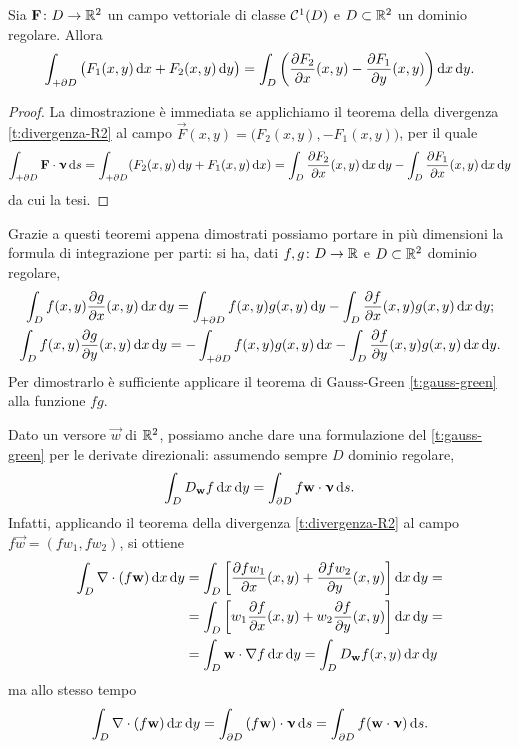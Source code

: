 \begin{teorema} \label{t:rotore-R2}
	Sia $\mathbf{F}\colon D\to\mathbb{R}^2$ un campo vettoriale di classe $\mathcal{C}^{{1}}(D)$ e $D\subset\mathbb{R}^2$ un dominio regolare.
	Allora
	\begin{equation}
		\int_{+\partial D}\big(F_1(x,y)\,\textup{d} x+F_2(x,y)\,\textup{d} y\big)=\int_D\bigg(\frac{\partial {F_2}}{\partial {x}}(x,y)-\frac{\partial {F_1}}{\partial {y}}(x,y)\bigg)\,\textup{d} x\,\textup{d} y.
		\label{eq:rotore-R2}
	\end{equation}
\end{teorema}
\begin{proof}
	La dimostrazione è immediata se applichiamo il teorema della divergenza \ref{t:divergenza-R2} al campo $\vec F(x,y)=\big(F_2(x,y),-F_1(x,y)\big)$, per il quale
	\begin{equation}
		\int_{+\partial D}{\mathbf{F}}\cdot{\bm{\upnu}}\,\textup{d} s=\int_{+\partial D}(F_2(x,y)\,\textup{d} y+F_1(x,y)\,\textup{d} x)=\int_D\frac{\partial {F_2}}{\partial {x}}(x,y)\,\textup{d} x\,\textup{d} y-\int_D\frac{\partial {F_1}}{\partial {x}}(x,y)\,\textup{d} x\,\textup{d} y
	\end{equation}
	da cui la tesi.
\end{proof}
Grazie a questi teoremi appena dimostrati possiamo portare in più dimensioni la formula di integrazione per parti: si ha, dati $f,g\colon D\to\mathbb{R}$ e $D\subset\mathbb{R}^2$ dominio regolare,
\begin{gather}
	\int_D f(x,y)\frac{\partial {g}}{\partial {x}}(x,y)\,\textup{d} x\,\textup{d} y=\int_{+\partial D}f(x,y)g(x,y)\,\textup{d} y-\int_D\frac{\partial {f}}{\partial {x}}(x,y)g(x,y)\,\textup{d} x\,\textup{d} y;\\
	\int_D f(x,y)\frac{\partial {g}}{\partial {y}}(x,y)\,\textup{d} x\,\textup{d} y=-\int_{+\partial D}f(x,y)g(x,y)\,\textup{d} x-\int_D\frac{\partial {f}}{\partial {y}}(x,y)g(x,y)\,\textup{d} x\,\textup{d} y.
\end{gather}
Per dimostrarlo è sufficiente applicare il teorema di Gauss-Green \ref{t:gauss-green} alla funzione $fg$.

Dato un versore $\vec w$ di $\mathbb{R}^2$, possiamo anche dare una formulazione del \ref{t:gauss-green} per le derivate direzionali: assumendo sempre $D$ dominio regolare,
\begin{equation}
	\int_DD_{\mathbf{w}}f\,\textup{d} x\,\textup{d} y=\int_{\partial D}f{\mathbf{w}}\cdot{\bm{\upnu}}\,\textup{d} s.
\end{equation}
Infatti, applicando il teorema della divergenza \ref{t:divergenza-R2} al campo $f\vec w=(fw_1,fw_2)$, si ottiene
\begin{equation}
	\begin{split}
		\int_D\nabla\cdot(f\mathbf{w})\,\textup{d} x\,\textup{d} y&=\int_D\bigg[\frac{\partial {fw_1}}{\partial {x}}(x,y)+\frac{\partial {fw_2}}{\partial {y}}(x,y)\bigg]\,\textup{d} x\,\textup{d} y=\\
		&=\int_D\bigg[w_1\frac{\partial {f}}{\partial {x}}(x,y)+w_2\frac{\partial {f}}{\partial {y}}(x,y)\bigg]\,\textup{d} x\,\textup{d} y=\\
		&=\int_D{\mathbf{w}}\cdot{\nabla f}\,\textup{d} x\,\textup{d} y=\int_DD_{\mathbf{w}}f(x,y)\,\textup{d} x\,\textup{d} y
	\end{split}
\end{equation}
ma allo stesso tempo
\begin{equation}
	\int_D\nabla\cdot(f\mathbf{w})\,\textup{d} x\,\textup{d} y=\int_{\partial D}{(f\mathbf{w})}\cdot{\bm{\upnu}}\,\textup{d} s=\int_{\partial D}f({\mathbf{w}}\cdot{\bm{\upnu}})\,\textup{d} s.
\end{equation}

